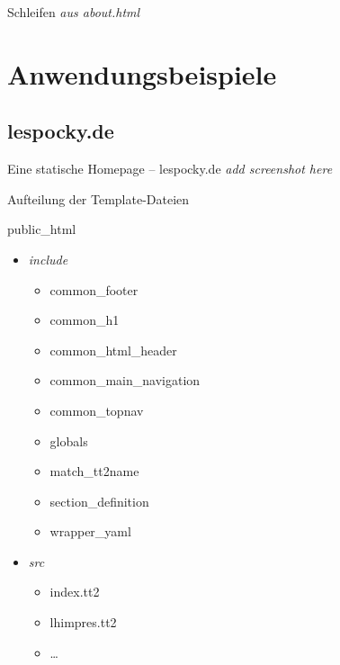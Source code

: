 \documentclass[hyperref={pdfpagelabels=false}]{beamer}
\begin{document}
\begin{frame}{Schleifen}
    \emph{aus about.html}
\end{frame}

\section{Anwendungsbeispiele}

\subsection{lespocky.de}

\begin{frame}{Eine statische Homepage -- lespocky.de}
    \emph{add screenshot here}
\end{frame}

\begin{frame}{Aufteilung der Template-Dateien}
    \begin{block}{public\_html}
        \begin{itemize}
            \item \emph{include}
                \begin{itemize}
                    \item common\_footer
                    \item common\_h1
                    \item common\_html\_header
                    \item common\_main\_navigation
                    \item common\_topnav
                    \item globals
                    \item match\_tt2name
                    \item section\_definition
                    \item wrapper\_yaml
                \end{itemize}
            \item \emph{src}
                \begin{itemize}
                    \item index.tt2
                    \item lhimpres.tt2
                    \item \dots
                \end{itemize}
        \end{itemize}
    \end{block}
\end{frame}
\end{document}
